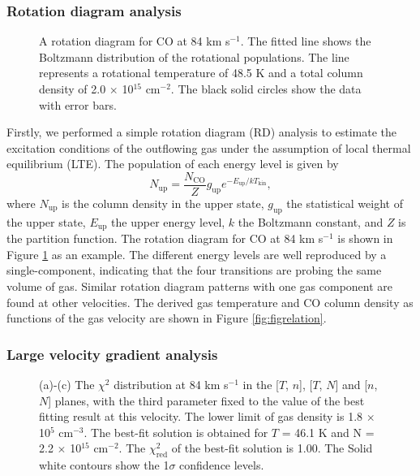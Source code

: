\subsubsection{Rotation diagram analysis\label{subsec:RD}}

\begin{figure}[tbp]
\caption{A rotation diagram for CO at 84 km s$^{-1}$. The fitted line shows the Boltzmann distribution of the rotational populations. The line represents a rotational temperature of 48.5 K and a total column density of 2.0 $\times$ 10$^{15}$ cm$^{-2}$. The black solid circles show the data with error bars. \label{fig:figrd}}
\end{figure}

Firstly, we performed a simple rotation diagram (RD) analysis \citep{1999ApJ...517..209G} to estimate the excitation conditions of the outflowing gas under the assumption of local thermal equilibrium (LTE). The population of each energy level is given by 
\begin{equation}
N_{\mathrm{up}} = \frac{N_\mathrm{CO}}{Z} g_\mathrm{up} e^{-E_\mathrm{up}/kT_\mathrm{kin}},
\end{equation}
where $N_\mathrm{up}$ is the column density in the upper state, $g_\mathrm{up}$ the statistical weight of the upper state, $E_\mathrm{up}$ the upper energy level, $k$ the Boltzmann constant, and $Z$ is the partition function. The rotation diagram for CO at 84 km s$^{-1}$ is shown in Figure \ref{fig:figrd} as an example. The different energy levels are well reproduced by a single-component, indicating that the four transitions are probing the same volume of gas. Similar rotation diagram patterns with one gas component are found at other velocities. The derived gas temperature and CO column density as functions of the gas velocity are shown in Figure \ref{fig:figrelation}.

\subsubsection{Large velocity gradient analysis\label{subsec:LVG}}

\begin{figure}[!tbp]
\caption{(a)-(c) The $\chi^2$ distribution at 84 km s$^{-1}$ in the [$T$, $n$], [$T$, $N$] and [$n$, $N$] planes, with the third parameter fixed to the value of the best fitting result at this velocity. The lower limit of gas density is 1.8 $\times$ 10$^{5}$ cm$^{-3}$. The best-fit solution is obtained for $T$ =  46.1 K and N = 2.2 $\times$ 10$^{15}$ cm$^{-2}$. The $\chi^2_{\mathrm{red}}$ of the best-fit solution is 1.00. The Solid white contours show the 1$\sigma$ confidence levels. \label{fig:figchi}}
\end{figure}

